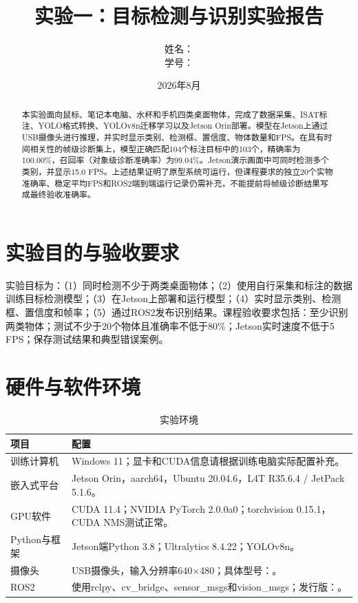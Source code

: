 \documentclass[UTF8,a4paper,12pt]{ctexart}
\title{实验一：目标检测与识别实验报告}
\author{姓名：\underline{\hspace{4cm}}\\ 学号：\underline{\hspace{4cm}}}
\date{2026年8月}
\begin{document}
\maketitle

\begin{abstract}
本实验面向鼠标、笔记本电脑、水杯和手机四类桌面物体，完成了数据采集、ISAT标注、YOLO格式转换、YOLOv8n迁移学习以及Jetson Orin部署。模型在Jetson上通过USB摄像头进行推理，并实时显示类别、检测框、置信度、物体数量和FPS。在具有时间相关性的帧级诊断集上，模型正确匹配104个标注目标中的103个，精确率为100.00\%，召回率（对象级诊断准确率）为99.04\%。Jetson演示画面中可同时检测多个类别，并显示15.0 FPS。上述结果证明了原型系统可运行，但课程要求的独立20个实物准确率、稳定平均FPS和ROS2端到端运行记录仍需补充，不能提前将帧级诊断结果写成最终验收准确率。
\end{abstract}

\section{实验目的与验收要求}
实验目标为：（1）同时检测不少于两类桌面物体；（2）使用自行采集和标注的数据训练目标检测模型；（3）在Jetson上部署和运行模型；（4）实时显示类别、检测框、置信度和帧率；（5）通过ROS2发布识别结果。课程验收要求包括：至少识别两类物体；测试不少于20个物体且准确率不低于80\%；Jetson实时速度不低于5 FPS；保存测试结果和典型错误案例。

\section{硬件与软件环境}
\begin{table}[H]\centering\caption{实验环境}\begin{tabularx}{\textwidth}{lX}\toprule 项目 & 配置 \\\midrule
训练计算机 & Windows 11；显卡和CUDA信息请根据训练电脑实际配置补充。\\
嵌入式平台 & Jetson Orin，aarch64，Ubuntu 20.04.6，L4T R35.6.4 / JetPack 5.1.6。\\
GPU软件 & CUDA 11.4；NVIDIA PyTorch 2.0.0a0；torchvision 0.15.1，CUDA NMS测试正常。\\
Python与框架 & Jetson端Python 3.8；Ultralytics 8.4.22；YOLOv8n。\\
摄像头 & USB摄像头，输入分辨率640$\times$480；具体型号：\underline{\hspace{3cm}}。\\
ROS2 & 使用rclpy、cv\_bridge、sensor\_msgs和vision\_msgs；发行版：\underline{\hspace{2cm}}。\\
\bottomrule\end{tabularx}\end{table}
\end{document}
